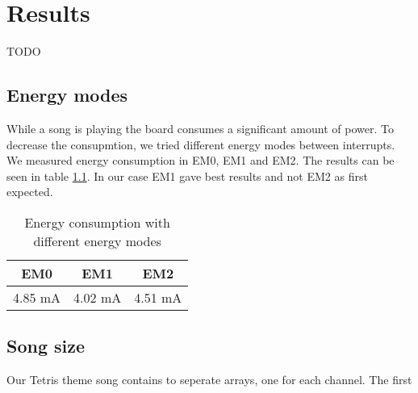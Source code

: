\chapter{Results}
TODO

\section{Energy modes}
\label{sec:energyModeResults}
While a song is playing the board consumes a significant amount of power. To decrease the consupmtion, we tried different energy modes between interrupts. We measured energy consumption in EM0, EM1 and EM2. The results can be seen in table \ref{tab:benchmarkEnergyModes}. In our case EM1 gave best results and not EM2 as first expected.

\begin{table}[ht]
	\begin{center}
	\begin{tabular}{ |c|c|c| }
	  \hline
	  EM0 & EM1 & EM2 \\
	  \hline
	  4.85 mA & 4.02 mA & 4.51 mA \\
	  \hline

	\end{tabular}
	\caption{Energy consumption with different energy modes}
	\label{tab:benchmarkEnergyModes}
	\end{center}
\end{table}

\section{Song size}
Our Tetris theme song contains to seperate arrays, one for each channel. The first